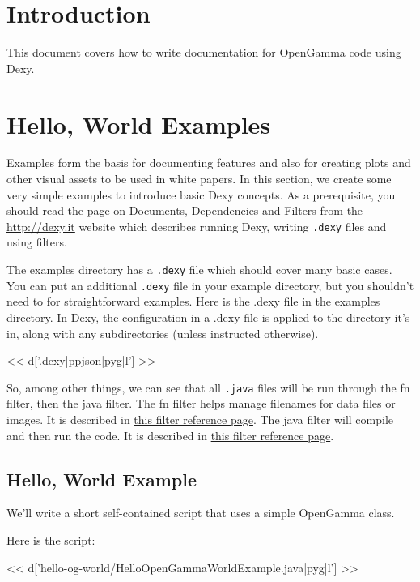 \section{Introduction}

This document covers how to write documentation for OpenGamma code using Dexy.

\section{Hello, World Examples}

Examples form the basis for documenting features and also for creating plots
and other visual assets to be used in white papers. In this section, we create
some very simple examples to introduce basic Dexy concepts. As a prerequisite,
you should read the page on
\href{http://www.dexy.it/docs/guide/documents-dependencies-and-filters/}{Documents, Dependencies and Filters}
from the \url{http://dexy.it} website which describes running Dexy, writing
\verb|.dexy| files and using filters.

The examples directory has a \verb|.dexy| file which should cover many basic
cases. You can put an additional \verb|.dexy| file in your example directory,
but you shouldn't need to for straightforward examples. Here is the .dexy file
in the examples directory. In Dexy, the configuration in a .dexy file is
applied to the directory it's in, along with any subdirectories (unless
instructed otherwise).

<< d['.dexy|ppjson|pyg|l'] >>

So, among other things, we can see that all \verb|.java| files will be run
through the fn filter, then the java filter. The fn filter helps manage
filenames for data files or images. It is described in
\href{http://www.dexy.it/docs/filters/FilenameFilter-(fn).html}{this filter reference page}.
The java filter will compile and then run the code. It is described in
\href{http://www.dexy.it/docs/filters/JavaFilter-(java).html}{this filter reference page}.

\subsection{Hello, World Example}

We'll write a short self-contained script that uses a simple OpenGamma class.

Here is the script:

<< d['hello-og-world/HelloOpenGammaWorldExample.java|pyg|l'] >>

